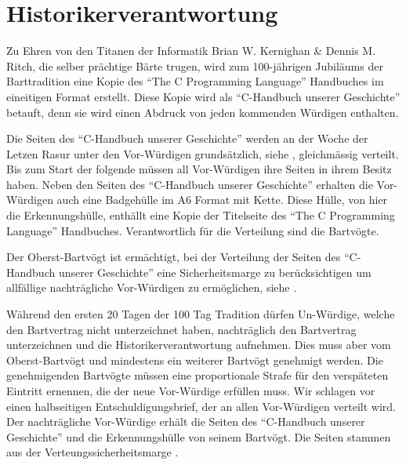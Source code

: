 \documentclass[fontsize=12pt,parskip=half]{scrartcl}
\begin{document}
\pagebreak
\section{Historikerverantwortung}
\begin{contract}

  \Clause[title={``C-Handbuch unserer Geschichte''}]
  Zu Ehren von den Titanen der Informatik Brian W. Kernighan \& Dennis M. Ritch, die selber prächtige Bärte trugen,
  wird zum 100-jährigen Jubiläums der Barttradition eine Kopie des ``The C Programming Language'' Handbuches im
  eineitigen Format erstellt. Diese Kopie wird als ``C-Handbuch unserer Geschichte'' betauft, denn sie wird einen
  Abdruck von jeden kommenden Würdigen enthalten.

  \Clause[title={Verteilung}]
  Die Seiten des ``C-Handbuch unserer Geschichte'' werden an der Woche der Letzen Rasur unter den Vor-Würdigen grundsätzlich, siehe , gleichmässig verteilt.
  Bis zum Start der folgende müssen all Vor-Würdigen ihre Seiten in ihrem Besitz haben. Neben den Seiten des ``C-Handbuch unserer Geschichte''
  erhalten die Vor-Würdigen auch eine Badgehülle im A6 Format mit Kette. Diese Hülle, von hier die Erkennungshülle, enthällt eine Kopie der
  Titelseite des ``The C Programming Language'' Handbuches. Verantwortlich für die Verteilung sind die Bartvögte.

  \SubClause[title={Verteilungssicherheitsmarge}]\label{H.verteilungsmarge}
  Der Oberst-Bartvögt ist ermächtigt, bei der Verteilung der Seiten des ``C-Handbuch unserer Geschichte'' eine Sicherheitsmarge zu berücksichtigen um allfällige nachträgliche Vor-Würdigen
  zu ermöglichen, siehe .

  \Clause[title={Nachträgliche Vor-Würdige}]\label{H.nachzug}
  Während den ersten 20 Tagen der 100 Tag Tradition dürfen Un-Würdige, welche den Bartvertrag nicht unterzeichnet haben, nachträglich den Bartvertrag unterzeichnen und die Historikerverantwortung
  aufnehmen. Dies muss aber vom Oberst-Bartvögt und mindestens ein weiterer Bartvögt genehmigt werden. Die genehmigenden Bartvögte müssen eine proportionale Strafe für den verspäteten Eintritt ernennen,
  die der neue Vor-Würdige erfüllen muss. Wir schlagen vor einen halbseitigen Entschuldigungsbrief, der an allen Vor-Würdigen verteilt wird. Der nachträgliche Vor-Würdige erhält die Seiten des ``C-Handbuch unserer Geschichte''
  und die Erkennungshülle von seinem Bartvögt. Die Seiten stammen aus der Verteungssicherheitsmarge .


\end{contract}
\end{document}

